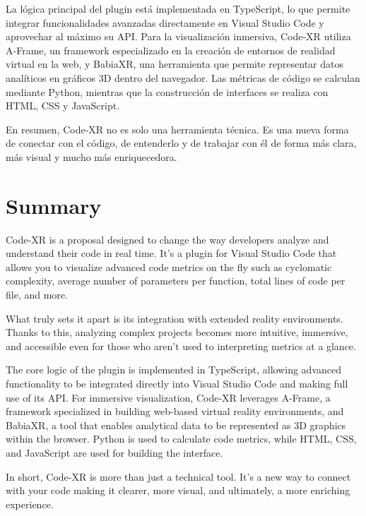 \documentclass[a4paper, 12pt]{book}
\begin{document}
La lógica principal del plugin está implementada en TypeScript, lo que permite integrar funcionalidades avanzadas directamente en Visual Studio Code y aprovechar al máximo su API. Para la visualización inmersiva, Code‑XR utiliza A-Frame, un framework especializado en la creación de entornos de realidad virtual en la web, y BabiaXR, una herramienta que permite representar datos analíticos en gráficos 3D dentro del navegador. Las métricas de código se calculan mediante Python, mientras que la construcción de interfaces se realiza con HTML, CSS y JavaScript.


En resumen, Code‑XR no es solo una herramienta técnica. Es una nueva forma de conectar con el código, de entenderlo y de trabajar con él de forma más clara, más visual y mucho más enriquecedora.




\chapter*{Summary}

Code‑XR is a proposal designed to change the way developers analyze and understand their code in real time. It’s a plugin for Visual Studio Code that allows you to visualize advanced code metrics on the fly such as cyclomatic complexity, average number of parameters per function, total lines of code per file, and more.

What truly sets it apart is its integration with extended reality environments. Thanks to this, analyzing complex projects becomes more intuitive, immersive, and accessible even for those who aren't used to interpreting metrics at a glance.

The core logic of the plugin is implemented in TypeScript, allowing advanced functionality to be integrated directly into Visual Studio Code and making full use of its API. For immersive visualization, Code‑XR leverages A-Frame, a framework specialized in building web-based virtual reality environments, and BabiaXR, a tool that enables analytical data to be represented as 3D graphics within the browser. Python is used to calculate code metrics, while HTML, CSS, and JavaScript are used for building the interface.

In short, Code‑XR is more than just a technical tool. It's a new way to connect with your code making it clearer, more visual, and ultimately, a more enriching experience.
\end{document}
